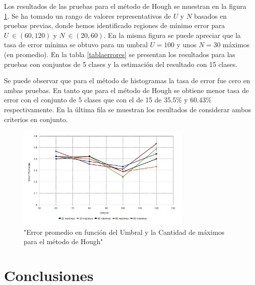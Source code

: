 \documentclass[conference,spanish,a4paper,10pt,oneside,final]{tfmpd}
\begin{document}
Los resultados de las pruebas para el método de Hough se muestran en la figura \ref{graficaerror}.
Se ha tomado un rango de valores representativos de $U$ y $N$ basados en pruebas previas, donde 
hemos identificado regiones de mínimo error para $U~\in(60,120)$ y $N~\in(20,60)$.
En la misma figura se puede apreciar que la tasa de error mínima se obtuvo para un umbral $U = 100$ 
y unos $N = 30$ máximos (en promedio).
%
En la tabla \ref{tablaerrores} se presentan los resultados para las pruebas con conjuntos de 5
clases y la estimación del resultado con 15 clases. 

Se puede observar que para el método de histogramas la tasa de error fue cero en
ambas pruebas. En tanto que para el método de Hough se obtiene menor tasa de error con el
conjunto de 5 clases que con el de 15 de 35.5\% y 60.43\% respectivamente.
En la última fila se muestran los resultados de considerar ambos criterios en conjunto. 

\begin{figure}
\begin{center}
\includegraphics[width=8.5cm]{../diagramas/estadistica_noche_iguales} 
\end{center}
\caption{"Error promedio en función del Umbral y la Cantidad de máximos para el método de Hough"}
\label{graficaerror}
\end{figure}
%
%
%
%
\section{Conclusiones}

%
%
%
%
\end{document}
